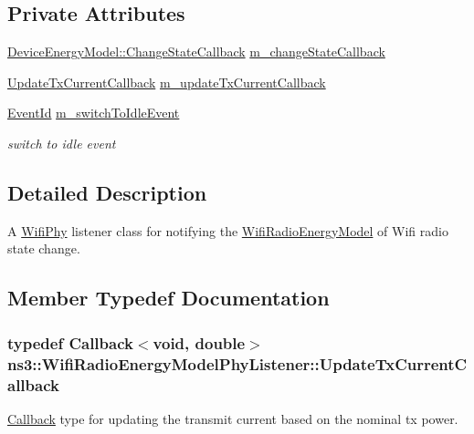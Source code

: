 \subsection*{Private Attributes}
\begin{DoxyCompactItemize}
\item 
\hyperlink{classns3_1_1DeviceEnergyModel_a26632ed1b86ee8f6c7fc4c756f0027ad}{Device\+Energy\+Model\+::\+Change\+State\+Callback} \hyperlink{classns3_1_1WifiRadioEnergyModelPhyListener_a098270b7f1cf683db02246ccfd280990}{m\+\_\+change\+State\+Callback}
\item 
\hyperlink{classns3_1_1WifiRadioEnergyModelPhyListener_a0263a4adc144a5406f9b4b504e7a7a16}{Update\+Tx\+Current\+Callback} \hyperlink{classns3_1_1WifiRadioEnergyModelPhyListener_a718497ae1babeb0343b4c4ec4122be85}{m\+\_\+update\+Tx\+Current\+Callback}
\item 
\hyperlink{classns3_1_1EventId}{Event\+Id} \hyperlink{classns3_1_1WifiRadioEnergyModelPhyListener_ad9c8198a14de28a5a70555d74d4a3000}{m\+\_\+switch\+To\+Idle\+Event}
\begin{DoxyCompactList}\small\item\em switch to idle event \end{DoxyCompactList}\end{DoxyCompactItemize}


\subsection{Detailed Description}
A \hyperlink{classns3_1_1WifiPhy}{Wifi\+Phy} listener class for notifying the \hyperlink{classns3_1_1WifiRadioEnergyModel}{Wifi\+Radio\+Energy\+Model} of Wifi radio state change. 

\subsection{Member Typedef Documentation}
\subsubsection[{\texorpdfstring{Update\+Tx\+Current\+Callback}{UpdateTxCurrentCallback}}]{\setlength{\rightskip}{0pt plus 5cm}typedef {\bf Callback}$<$void, double$>$ {\bf ns3\+::\+Wifi\+Radio\+Energy\+Model\+Phy\+Listener\+::\+Update\+Tx\+Current\+Callback}}\hypertarget{classns3_1_1WifiRadioEnergyModelPhyListener_a0263a4adc144a5406f9b4b504e7a7a16}{}\label{classns3_1_1WifiRadioEnergyModelPhyListener_a0263a4adc144a5406f9b4b504e7a7a16}
\hyperlink{classns3_1_1Callback}{Callback} type for updating the transmit current based on the nominal tx power. 

